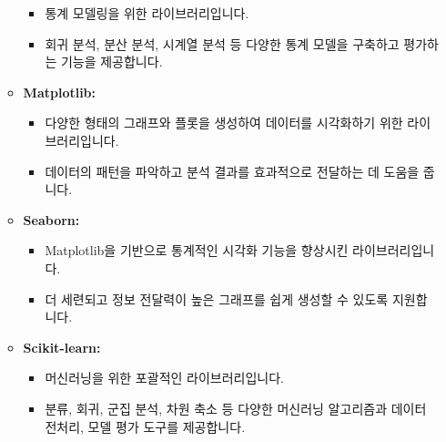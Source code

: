 \documentclass[
  letterpaper,
]{book}
\providecommand{\tightlist}{%
  \setlength{\itemsep}{0pt}\setlength{\parskip}{0pt}}
\begin{document}
\begin{itemize}
\begin{itemize}
    \begin{itemize}
    \tightlist
    \item
      통계 모델링을 위한 라이브러리입니다.
    \item
      회귀 분석, 분산 분석, 시계열 분석 등 다양한 통계 모델을 구축하고
      평가하는 기능을 제공합니다.
    \end{itemize}
  \item
    \textbf{Matplotlib:}

    \begin{itemize}
    \tightlist
    \item
      다양한 형태의 그래프와 플롯을 생성하여 데이터를 시각화하기 위한
      라이브러리입니다.
    \item
      데이터의 패턴을 파악하고 분석 결과를 효과적으로 전달하는 데 도움을
      줍니다.
    \end{itemize}
  \item
    \textbf{Seaborn:}

    \begin{itemize}
    \tightlist
    \item
      Matplotlib을 기반으로 통계적인 시각화 기능을 향상시킨
      라이브러리입니다.
    \item
      더 세련되고 정보 전달력이 높은 그래프를 쉽게 생성할 수 있도록
      지원합니다.
    \end{itemize}
  \item
    \textbf{Scikit-learn:}

    \begin{itemize}
    \tightlist
    \item
      머신러닝을 위한 포괄적인 라이브러리입니다.
    \item
      분류, 회귀, 군집 분석, 차원 축소 등 다양한 머신러닝 알고리즘과
      데이터 전처리, 모델 평가 도구를 제공합니다.
    \end{itemize}
  \end{itemize}


\end{itemize}
\end{document}
